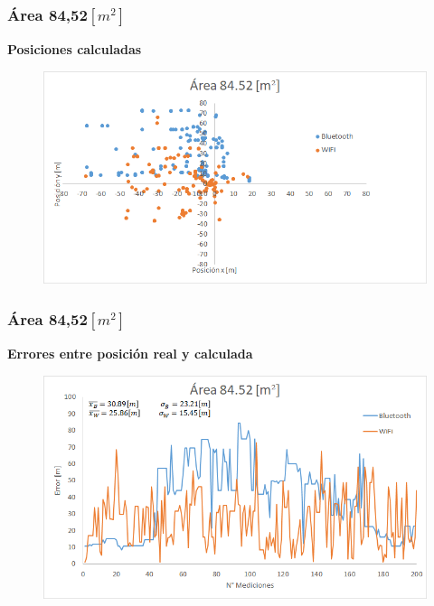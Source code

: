 \documentclass[mathserif]{beamer}
\begin{document}

\begin{frame}
\frametitle{Área 84,52$[m^2]$}

\textbf{Posiciones calculadas}

\begin{figure}
\includegraphics[width=\textwidth]{../figures_chesta/resultados/posicion__84_52}
\end{figure}


\end{frame}


\begin{frame}
\frametitle{Área 84,52$[m^2]$}

\textbf{Errores entre posición real y calculada}

\begin{figure}
\includegraphics[width=\textwidth]{../figures_chesta/resultados/area__84_52}
\end{figure}



\end{frame}
\end{document}
